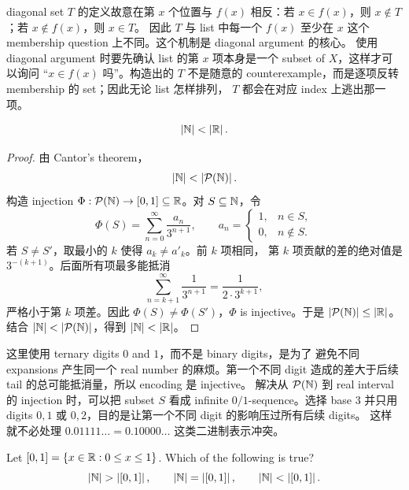 \begin{explanation}
diagonal set \(T\) 的定义故意在第 \(x\) 个位置与 \(f(x)\) 相反：若
\(x\in f(x)\)，则 \(x\notin T\)；若 \(x\notin f(x)\)，则 \(x\in T\)。
因此 \(T\) 与 list 中每一个 \(f(x)\) 至少在 \(x\) 这个 membership
question 上不同。这个机制是 diagonal argument 的核心。
使用 diagonal argument 时要先确认 list 的第 \(x\) 项本身是一个 subset of
\(X\)，这样才可以询问 ``\(x\in f(x)\) 吗''。构造出的 \(T\) 不是随意的
counterexample，而是逐项反转 membership 的 set；因此无论 list 怎样排列，
\(T\) 都会在对应 index 上逃出那一项。
\end{explanation}

\begin{theorem}
\[
  \left|\mathbb{N}\right|<\left|\mathbb{R}\right|.
\]
\end{theorem}

\begin{proof}
由 Cantor's theorem，
\[
  \left|\mathbb{N}\right|<\left|\mathcal{P}(\mathbb{N})\right|.
\]
构造 injection \(\Phi:\mathcal{P}(\mathbb{N})\to[0,1]\subseteq\mathbb{R}\)。对
\(S\subseteq\mathbb{N}\)，令
\[
  \Phi(S)=\sum_{n=0}^{\infty}\frac{a_n}{3^{n+1}},
  \qquad
  a_n=
  \begin{cases}
    1,&n\in S,\\
    0,&n\notin S.
  \end{cases}
\]
若 \(S\ne S'\)，取最小的 \(k\) 使得 \(a_k\ne a'_k\)。前 \(k\) 项相同，
第 \(k\) 项贡献的差的绝对值是 \(3^{-(k+1)}\)。后面所有项最多能抵消
\[
  \sum_{n=k+1}^{\infty}\frac{1}{3^{n+1}}
  =\frac{1}{2\cdot 3^{k+1}},
\]
严格小于第 \(k\) 项差。因此 \(\Phi(S)\ne\Phi(S')\)，\(\Phi\) is
injective。于是 \(\left|\mathcal{P}(\mathbb{N})\right|\le\left|\mathbb{R}\right|\)。结合
\(\left|\mathbb{N}\right|<\left|\mathcal{P}(\mathbb{N})\right|\)，得到 \(\left|\mathbb{N}\right|<\left|\mathbb{R}\right|\)。
\end{proof}

\begin{explanation}
这里使用 ternary digits \(0\) and \(1\)，而不是 binary digits，是为了
避免不同 expansions 产生同一个 real number 的麻烦。第一个不同 digit
造成的差大于后续 tail 的总可能抵消量，所以 encoding 是 injective。
解决从 \(\mathcal{P}(\mathbb{N})\) 到 real interval 的 injection 时，可以把 subset
\(S\) 看成 infinite \(0/1\)-sequence。选择 base \(3\) 并只用 digits
\(0,1\) 或 \(0,2\)，目的是让第一个不同 digit 的影响压过所有后续 digits。
这样就不必处理 \(0.01111\ldots=0.10000\ldots\) 这类二进制表示冲突。
\end{explanation}

\begin{exerciseblock}
Let \([0,1]=\{x\in\mathbb{R}:0\le x\le 1\}\). Which of the following is true?
\[
  \card{\N}>\card{[0,1]},\qquad
  \card{\N}=\card{[0,1]},\qquad
  \card{\N}<\card{[0,1]}.
\]
\end{exerciseblock}

